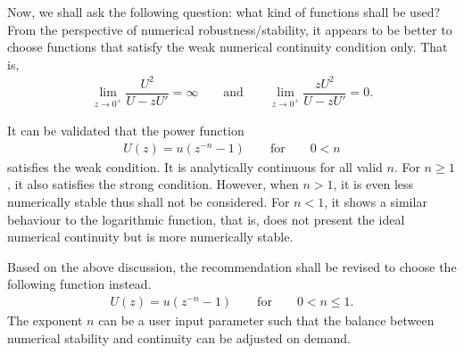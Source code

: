 Now, we shall ask the following question: what kind of functions shall be used?
From the perspective of numerical robustness/stability, it appears to be better to choose functions that satisfy the weak numerical continuity condition only.
That is,
\begin{gather}
    \lim\limits_{z\to0^+}\dfrac{U^2}{U-zU'}=\infty\qquad\text{and}\qquad\lim\limits_{z\to0^+}\dfrac{zU^2}{U-zU'}=0.
\end{gather}

It can be validated that the power function
\begin{gather}
    U\left(z\right)=u\left(z^{-n}-1\right)\qquad\text{for}\qquad{}0<n
\end{gather}
satisfies the weak condition.
It is analytically continuous for all valid $n$.
For $n\geqslant1$, it also satisfies the strong condition.
However, when $n>1$, it is even less numerically stable thus shall not be considered.
For $n<1$, it shows a similar behaviour to the logarithmic function, that is, does not present the ideal numerical continuity but is more numerically stable.

Based on the above discussion, the recommendation shall be revised to choose the following function instead.
\begin{gather}
    U\left(z\right)=u\left(z^{-n}-1\right)\qquad\text{for}\qquad{}0<n\leqslant1.
\end{gather}
The exponent $n$ can be a user input parameter such that the balance between numerical stability and continuity can be adjusted on demand.